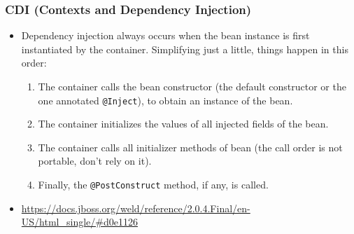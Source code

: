 \documentclass[10pt,xcolor=pdflatex]{beamer}
\begin{document}
\begin{frame}[fragile]\frametitle{CDI (Contexts and Dependency Injection)}
\begin{itemize}
  \item Dependency injection always occurs when the bean instance is first instantiated by the container. Simplifying just a little, things happen in this order:
    \begin{enumerate}
      \item The container calls the bean constructor (the default constructor or the one annotated \texttt{@Inject}), to obtain an instance of the bean.
      \item The container initializes the values of all injected fields of the bean.
      \item The container calls all initializer methods of bean (the call order is not portable, don’t rely on it).
      \item Finally, the \texttt{@PostConstruct} method, if any, is called.
    \end{enumerate}
  \item[] \url{https://docs.jboss.org/weld/reference/2.0.4.Final/en-US/html_single/#d0e1126}
\end{itemize}
\end{frame}
\end{document}
